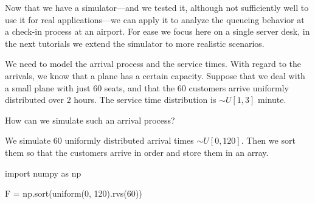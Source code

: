 Now that we have a simulator---and we tested it, although not sufficiently well to use it for real applications---we can apply it to analyze the queueing behavior at a check-in process at an airport.
For ease we focus here on a single server desk, in the next tutorials we  extend the simulator to more realistic scenarios.

We need to model the arrival process and the service times.
With regard to the arrivals, we know that a plane has a certain capacity.
Suppose that we deal with a small plane with just 60 seats, and that the 60 customers arrive uniformly distributed over 2 hours.
The service time distribution is $\sim U[1,3]$ minute.

\begin{exercise}
  How can we simulate such an arrival process?
\begin{solution}
  We simulate 60 uniformly distributed arrival times $\sim U[0, 120]$. Then we sort them so that the customers arrive in order and  store them in an array.
\begin{pyverbatim}
import numpy as np

F = np.sort(uniform(0, 120).rvs(60))
\end{pyverbatim}
\end{solution}
\end{exercise}



